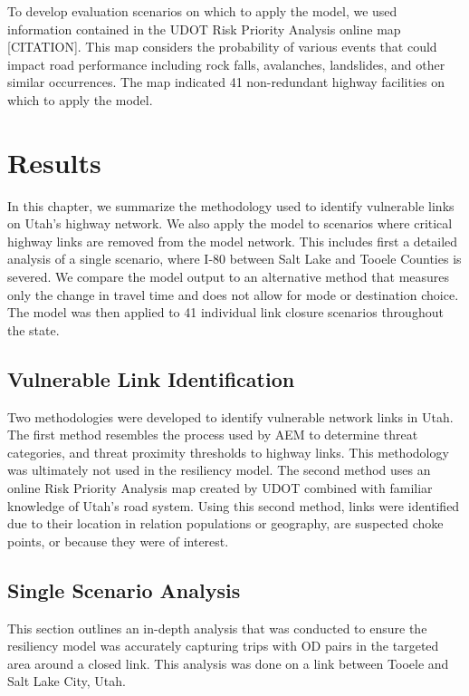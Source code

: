 \documentclass[3p, authoryear]{elsarticle} %
\begin{document}
To develop evaluation scenarios on which to apply the model, we used information
contained in the UDOT Risk Priority Analysis online map {[}CITATION{]}. This map
considers the probability of various events that could impact road performance
including rock falls, avalanches, landslides, and other similar occurrences.
The map indicated 41 non-redundant highway facilities on which to apply the model.

\hypertarget{results}{%
\section{Results}\label{results}}

In this chapter, we summarize the methodology used to identify
vulnerable links on Utah's highway network. We also apply the model to scenarios
where critical highway links are removed from the model network. This includes
first a detailed analysis of a single scenario, where I-80 between Salt Lake and
Tooele Counties is severed. We compare the model output to an alternative method
that measures only the change in travel time and does not allow for mode or
destination choice. The model was then applied to 41 individual link closure
scenarios throughout the state.

\hypertarget{vulnerable-link-identification-1}{%
\subsection{Vulnerable Link Identification}\label{vulnerable-link-identification-1}}

Two methodologies were developed to identify vulnerable network links in Utah.
The first method resembles the process used by AEM to determine threat
categories, and threat proximity thresholds to highway links. This methodology
was ultimately not used in the resiliency model. The second method uses an
online Risk Priority Analysis map created by UDOT combined with familiar
knowledge of Utah's road system. Using this second method, links were identified
due to their location in relation populations or geography, are suspected choke
points, or because they were of interest.

\hypertarget{single-scenario-analysis}{%
\subsection{Single Scenario Analysis}\label{single-scenario-analysis}}

This section outlines an in-depth analysis that was conducted to ensure the
resiliency model was accurately capturing trips with OD pairs in the targeted
area around a closed link. This analysis was done on a link between Tooele and
Salt Lake City, Utah.
\end{document}
